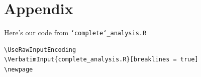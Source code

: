\documentclass[11pt]{article}
\begin{document}
\section{Appendix}
Here's our code from \texttt{\char`complete\char`_analysis.R}

\begin{lstlisting}
\UseRawInputEncoding
\VerbatimInput{complete_analysis.R}[breaklines = true]
\newpage
\end{lstlisting}



 


\end{document}
